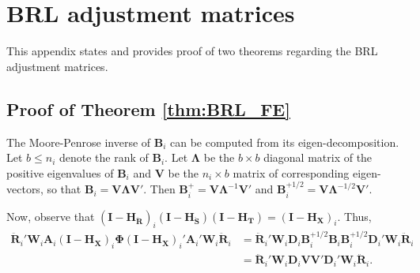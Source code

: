 \documentclass[12pt]{article}\usepackage[]{graphicx}\usepackage[]{color}
\newcommand{\bm}{\mathbf}
\newcommand{\bs}{\boldsymbol}
\begin{document}
\appendix

\section{BRL adjustment matrices}
\label{app:theorems}

This appendix states and provides proof of two theorems regarding the BRL adjustment matrices. 

\subsection{Proof of Theorem \ref{thm:BRL_FE}}

The Moore-Penrose inverse of $\bm{B}_i$ can be computed from its eigen-decomposition. Let $b \leq n_i$ denote the rank of $\bm{B}_i$. 
Let $\bs\Lambda$ be the $b \times b$ diagonal matrix of the positive eigenvalues of $\bm{B}_i$ and $\bm{V}$ be the $n_i \times b$ matrix of corresponding eigen-vectors, so that $\bm{B}_i = \bm{V}\bs\Lambda\bm{V}'$. 
Then $\bm{B}_i^+ = \bm{V}\bs\Lambda^{-1}\bm{V}'$ and $\bm{B}_i^{+1/2} = \bm{V}\bs\Lambda^{-1/2}\bm{V}'$.

Now, observe that $\left(\bm{I} - \bm{H_{\ddot{R}}}\right)_i \left(\bm{I} - \bm{H_{\ddot{S}}}\right) \left(\bm{I} - \bm{H_T}\right) = \left(\bm{I} - \bm{H_X}\right)_i$. Thus, 
\begin{align}
\label{eq:step1}
\bm{\ddot{R}}_i' \bm{W}_i \bm{A}_i \left(\bm{I} - \bm{H_X}\right)_i \bs\Phi \left(\bm{I} - \bm{H_X}\right)_i' \bm{A}_i' \bm{W}_i \bm{\ddot{R}}_i &= \bm{\ddot{R}}_i' \bm{W}_i \bm{D}_i \bm{B}_i^{+1/2} \bm{B}_i \bm{B}_i^{+1/2} \bm{D}_i' \bm{W}_i \bm{\ddot{R}}_i \nonumber \\
&= \bm{\ddot{R}}_i' \bm{W}_i \bm{D}_i \bm{V}\bm{V}' \bm{D}_i' \bm{W}_i \bm{\ddot{R}}_i. 
\end{align}
\end{document}
